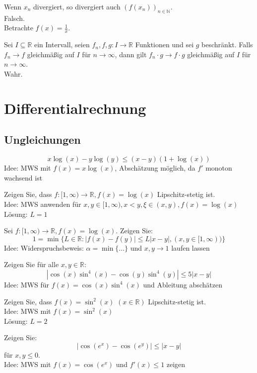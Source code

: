 \documentclass[parskip=full]{scrartcl}
\begin{document}
Wenn $x_n$ divergiert, so divergiert auch $(f(x_n))_{n \in \mathbb{N}}$.\\
Falsch.\\
Betrachte $f(x) = \frac{1}{x}$.

Sei $I \subseteq \mathbb{R}$ ein Intervall, seien $f_n, f, g : I \to \mathbb{R}$ Funktionen und sei $g$ beschränkt.
Falls $f_n \to f$ gleichmäßig auf $I$ für $n \to \infty$, dann gilt $f_n \cdot g \to f \cdot g$ gleichmäßig auf $I$ für $n \to \infty$.\\
Wahr.

\section{Differentialrechnung}
\subsection{Ungleichungen}
\begin{displaymath}
  x \log(x) - y \log(y) \leq (x - y)(1 + \log(x))
\end{displaymath}
Idee: MWS mit $f(x) = x \log(x)$, Abschätzung möglich, da $f'$ monoton wachsend ist

Zeigen Sie, dass $f : [1, \infty) \to \mathbb{R}, f(x) = \log(x)$ Lipschitz-stetig ist.\\
Idee: MWS anwenden für $x, y \in [1, \infty), x < y, \xi \in (x,y), f(x) = \log(x)$\\
Lösung: $L = 1$

Sei $f:[1, \infty) \to \mathbb{R}, f(x) = \log(x)$.
Zeigen Sie:
\begin{displaymath}
  1 = \min\{L \in \mathbb{R}: |f(x) - f(y)| \leq L|x-y|, (x,y \in [1,\infty))\}
\end{displaymath}
Idee: Widerspruchsbeweis: $\alpha = \min\{\dots\}$ und $x,y \to 1$ laufen lassen

Zeigen Sie für alle $x,y \in \mathbb{R}$:
\begin{displaymath}
  |\cos(x)\sin^4(x) - \cos(y)\sin^4(y)| \leq 5|x-y|
\end{displaymath}
Idee: MWS für $f(x) = \cos(x)\sin^4(x)$ und Ableitung abschätzen

Zeigen Sie, dass $f(x) = \sin^2(x)$ $(x \in \mathbb{R})$ Lipschitz-stetig ist.\\
Idee: MWS mit $f(x) = \sin^2(x)$\\
Lösung: $L = 2$

Zeigen Sie:
\begin{displaymath}
  |\cos(e^x) - \cos(e^y)| \leq |x-y|
\end{displaymath}
für $x,y \leq 0$.\\
Idee: MWS mit $f(x) = \cos(e^x)$ und $f'(x) \leq 1$ zeigen
\end{document}
